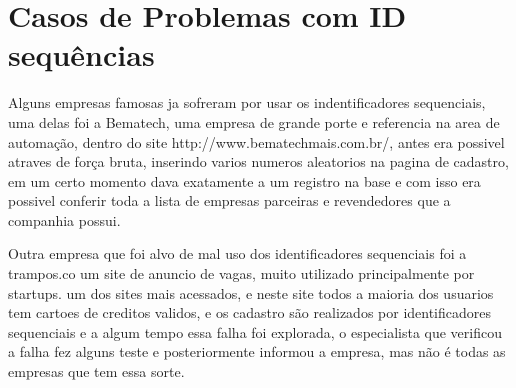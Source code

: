 \section{Casos de Problemas com ID sequências}
Alguns empresas famosas ja sofreram por usar os indentificadores sequenciais,
uma delas foi a Bematech, uma empresa de grande porte e referencia na area de automação,
dentro do site http://www.bematechmais.com.br/, antes era possivel atraves de força bruta,
inserindo varios numeros aleatorios na pagina de cadastro, em um certo momento dava exatamente a um registro na base
e com isso era possivel conferir toda a lista de empresas parceiras e revendedores que a companhia possui. 

Outra empresa que foi alvo de mal uso dos identificadores sequenciais foi a 
trampos.co um site de anuncio de vagas, muito utilizado principalmente por startups.
um dos sites mais acessados, e neste site todos a maioria dos usuarios tem cartoes de creditos validos, e os cadastro
são realizados por identificadores sequenciais e a algum tempo essa falha foi explorada, o especialista que verificou a falha
fez alguns teste e posteriormente informou a empresa, mas não é todas as empresas que tem essa sorte.